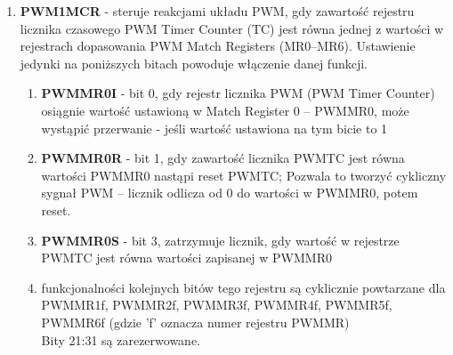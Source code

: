 \begin{enumerate}
\begin{enumerate}
\begin{enumerate}
            \item \textbf{PWM1MCR} - steruje reakcjami układu PWM, gdy zawartość rejestru licznika czasowego PWM Timer Counter (TC) jest równa jednej z wartości w rejestrach dopasowania PWM Match Registers (MR0–MR6). Ustawienie jedynki na poniższych bitach powoduje włączenie danej funkcji.
            \begin{enumerate}
                \item \textbf{PWMMR0I} - bit 0, gdy rejestr licznika PWM (PWM Timer Counter) osiągnie wartość ustawioną w Match Register 0 – PWMMR0, może wystąpić przerwanie - jeśli wartość ustawiona na tym bicie to 1
                \item \textbf{PWMMR0R} - bit 1, gdy zawartość licznika PWMTC jest równa wartości PWMMR0 nastąpi reset PWMTC; Pozwala to tworzyć cykliczny sygnał PWM – licznik odlicza od 0 do wartości w PWMMR0, potem reset.
                \item \textbf{PWMMR0S} - bit 3, zatrzymuje licznik, gdy wartość w rejestrze PWMTC jest równa wartości zapisanej w PWMMR0
                \item funkcjonalności kolejnych bitów tego rejestru są cyklicznie powtarzane dla PWMMR1f, PWMMR2f, PWMMR3f, PWMMR4f, PWMMR5f, PWMMR6f (gdzie 'f' oznacza numer rejestru PWMMR)\\
                                        Bity 21:31 są zarezerwowane.
            \end{enumerate}


\end{enumerate}
\end{enumerate}
\end{enumerate}

